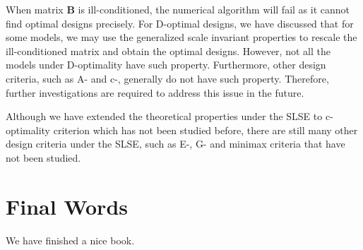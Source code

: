 \documentclass[
]{book}
\theoremstyle{definition}
\theoremstyle{definition}
\theoremstyle{definition}
\theoremstyle{definition}
\theoremstyle{remark}
\begin{document}
When matrix \(\boldsymbol{B}\) is ill-conditioned, the numerical algorithm will fail as it cannot find optimal designs precisely. For D-optimal designs, we have discussed that for some models, we may use the generalized scale invariant properties to rescale the ill-conditioned matrix and obtain the optimal designs. However, not all the models under D-optimality have such property. Furthermore, other design criteria, such as A- and c-, generally do not have such property. Therefore, further investigations are required to address this issue in the future.

Although we have extended the theoretical properties under the SLSE to c-optimality criterion which has not been studied before, there are still many other design criteria under the SLSE, such as E-, G- and minimax criteria that have not been studied.

\chapter{Final Words}\label{final-words}

We have finished a nice book.

  
\end{document}
